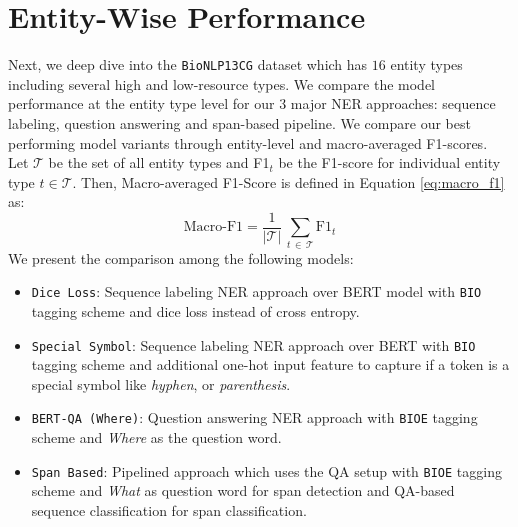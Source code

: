 \section{Entity-Wise Performance}
Next, we deep dive into the \texttt{BioNLP13CG} dataset which has $16$ entity types including several high and low-resource types. We compare the model performance at the entity type level for our 3 major NER approaches: sequence labeling, question answering and span-based pipeline. We compare our best performing model variants through entity-level and macro-averaged F1-scores. Let $\mathcal{T}$ be the set of all entity types and F1$_t$ be the F1-score for individual entity type $t \in \mathcal{T}$. Then, Macro-averaged F1-Score is defined in Equation \ref{eq:macro_f1} as:
\begin{equation}
\label{eq:macro_f1}
    \text{Macro-F1} = \frac{1}{\mathcal{\vert\mathcal{T}\vert}}\,\sum_{t\,\in\,\mathcal{T}}{\text{F1}_t}
\end{equation}
We present the comparison among the following models:
\begin{itemize}
    \item \texttt{Dice Loss}: Sequence labeling NER approach over BERT model with \texttt{BIO} tagging scheme and dice loss instead of cross entropy.
    
    \item \texttt{Special Symbol}: Sequence labeling NER approach over BERT with \texttt{BIO} tagging scheme and additional one-hot input feature to capture if a token is a special symbol like \textit{hyphen}, or \textit{parenthesis}.
    
    \item \texttt{BERT-QA (Where)}: Question answering NER approach with \texttt{BIOE} tagging scheme and \textit{Where} as the question word.
    
    \item \texttt{Span Based}: Pipelined approach which uses the QA setup with \texttt{BIOE} tagging scheme and \textit{What} as question word for span detection and QA-based sequence classification for span classification.
\end{itemize}

